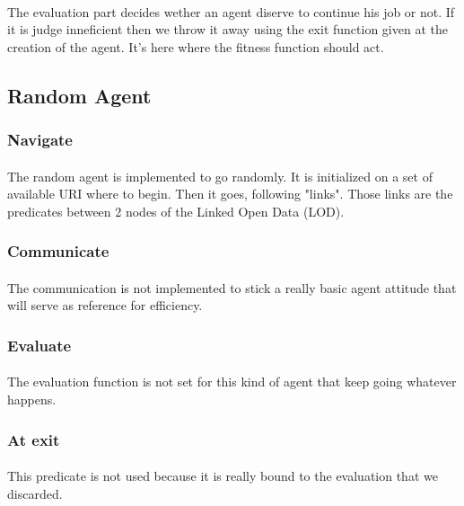 \documentclass{article}
\begin{document}
	\paragraph{}
		The evaluation part decides wether an agent diserve to continue his job or not.
		If it is judge inneficient then we throw it away using the exit function given at the creation of the agent.
		It's here where the fitness function should act.
	\subsection{Random Agent}
		\subsubsection{Navigate}
			\paragraph{}
			The random agent is implemented to go randomly.
			It is initialized on a set of available URI where to begin.
			Then it goes, following "links".
			Those links are the predicates between 2 nodes of the Linked Open Data (LOD).
		\subsubsection{Communicate}
			\paragraph{}
			The communication is not implemented to stick a really basic agent attitude that will serve as reference for efficiency.
		\subsubsection{Evaluate}
			\paragraph{}
			The evaluation function is not set for this kind of agent that keep going whatever happens.
		\subsubsection{At exit}
			\paragraph{}
			This predicate is not used because it is really bound to the evaluation that we discarded.
\end{document}
